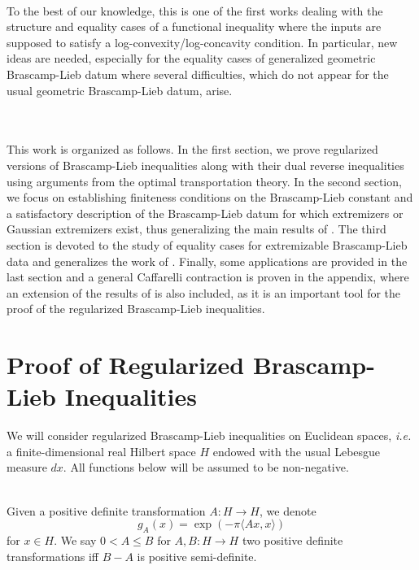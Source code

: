 \documentclass[11pt,a4paper,reqno]{amsart}
\numberwithin{equation}{section}
\theoremstyle{definition}
\newcommand{\<}{\ensuremath \leq}
\renewcommand{\>}{\ensuremath \geq}
\begin{document}
\hfill \\
To the best of our knowledge, this is one of the first works dealing with the structure and equality cases of a functional inequality where the inputs are supposed to satisfy a log-convexity/log-concavity condition. In particular, new ideas are needed, especially for the equality cases of generalized geometric Brascamp-Lieb datum where several difficulties, which do not appear for the usual geometric Brascamp-Lieb datum, arise. 



\hfill \\ \\ This work is organized as follows. In the first section, we prove regularized versions of Brascamp-Lieb inequalities along with their dual reverse inequalities using arguments from the optimal transportation theory. In the second section, we focus on establishing finiteness conditions on the Brascamp-Lieb constant and a satisfactory description of the Brascamp-Lieb datum for which extremizers or Gaussian extremizers exist, thus generalizing the main results of \cite{BCCT}. The third section is devoted to the study of equality cases for extremizable Brascamp-Lieb data and generalizes the work of \cite{Vald2}. Finally, some applications are provided in the last section and a general Caffarelli contraction is proven in the appendix, where an extension of the results of \cite{Guido} is also included, as it is an important tool for the proof of the regularized Brascamp-Lieb inequalities. 




\bigskip


\section{Proof of Regularized Brascamp-Lieb Inequalities}

We will consider regularized Brascamp-Lieb inequalities on Euclidean spaces, \textit{i.e.} a finite-dimensional real Hilbert space $H$ endowed with the usual Lebesgue measure $dx.$ 
All functions below will be assumed to be non-negative. 


\hfill \\


Given a positive definite transformation $A: H \rightarrow H$, we denote $$g_A(x)=\exp(-\pi \langle Ax,x \rangle)$$ for $x \in H.$ We say $0<A \leq B$ for $A,B: H \rightarrow H$ two positive definite transformations iff $B-A$ is positive semi-definite. 
\end{document}

